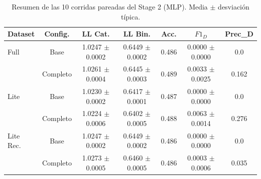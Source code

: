 \begin{table}[htbp]
    \centering
    \caption{Resumen de las 10 corridas pareadas del Stage 2 (MLP). Media $\pm$ desviación típica.}
    \label{tab:stage2_resumen}
    \begin{tabular}{lcccccc}
        \toprule
        \textbf{Dataset} & \textbf{Config.} & \textbf{LL Cat.} & \textbf{LL Bin.} & \textbf{Acc.} & \textbf{$F1_D$} & \textbf{Prec\_D} \\
        \midrule
        Full & Base & 1.0247 $\pm$ 0.0002 & 0.6449 $\pm$ 0.0002 & 0.486 & 0.0000 $\pm$ 0.0000 & 0.0 \\
         & Completo & 1.0261 $\pm$ 0.0004 & 0.6445 $\pm$ 0.0003 & 0.489 & 0.0033 $\pm$ 0.0025 & 0.162 \\
        \midrule
        Lite & Base & 1.0230 $\pm$ 0.0002 & 0.6417 $\pm$ 0.0001 & 0.487 & 0.0000 $\pm$ 0.0000 & 0.0 \\
         & Completo & 1.0224 $\pm$ 0.0006 & 0.6402 $\pm$ 0.0005 & 0.488 & 0.0063 $\pm$ 0.0014 & 0.276 \\
        \midrule
        Lite Rec. & Base & 1.0247 $\pm$ 0.0002 & 0.6449 $\pm$ 0.0002 & 0.486 & 0.0000 $\pm$ 0.0000 & 0.0 \\
         & Completo & 1.0273 $\pm$ 0.0005 & 0.6460 $\pm$ 0.0005 & 0.486 & 0.0003 $\pm$ 0.0006 & 0.035 \\
        \bottomrule
    \end{tabular}
\end{table}